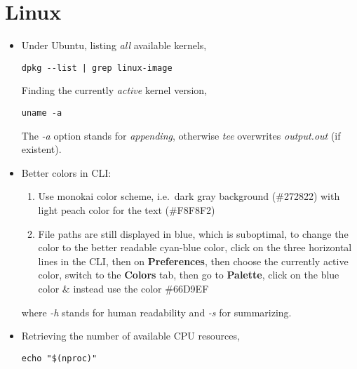 \documentclass[12pt, a4paper]{article}
\numberwithin{equation}{section}
\theoremstyle{definition}
\theoremstyle{definition}
\begin{document}
	\section{Linux}
	\begin{itemize}
	
		\item Under Ubuntu, listing \textit{all} available kernels, 
	
		\begin{lstlisting}[style=mystylebash, label=alg:ubuntu_kernel, caption=Find kernel versions in Ubuntu, xleftmargin=\parindent]
			dpkg --list | grep linux-image
		\end{lstlisting}

		Finding the currently \textit{active} kernel version,
		\begin{lstlisting}[style=mystylebash, label=alg:ubuntu_kernel__current, caption=Current kerel versions in Ubuntu, xleftmargin=\parindent]
			uname -a
		\end{lstlisting}
	
		The \textit{-a} option stands for \textit{appending}, otherwise \textit{tee} overwrites \textit{output.out} (if existent). 

		\item Better colors in CLI: 
		
		\begin{enumerate}
			\item Use monokai color scheme, i.e.~dark gray background (\#272822) with light peach color for the text (\#F8F8F2)
			\item File paths are still displayed in blue, which is suboptimal, to change the color to the better readable cyan-blue color, click on the three horizontal lines in the CLI, then on \textbf{Preferences}, then choose the currently active color, switch to the \textbf{Colors} tab, then go to \textbf{Palette}, click on the blue color \& instead use the color \#66D9EF
		\end{enumerate}
	
		where \textit{-h} stands for human readability and \textit{-s} for summarizing. 
		
		\item Retrieving the number of available CPU resources,
		
		\begin{lstlisting}[style=mystylebash, label=alg:bash__cpu_res, xleftmargin=\parindent]
			echo "$(nproc)"
		\end{lstlisting}
		

\end{itemize}
\end{document}
